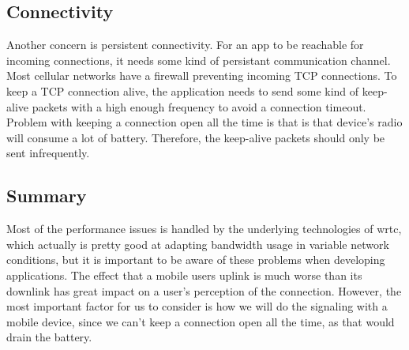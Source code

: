 \subsection{Connectivity}
Another concern is persistent connectivity. For an app to be reachable for incoming connections, it needs some kind of persistant communication channel. Most cellular networks have a firewall preventing incoming TCP connections\cite{isomaki2012considerations}. To keep a TCP connection alive, the application needs to send some kind of keep-alive packets with a high enough frequency to avoid a connection timeout. Problem with keeping a connection open all the time is that is that device's radio will consume a lot of battery. Therefore, the keep-alive packets should only be sent infrequently.

\subsection{Summary}
Most of the performance issues is handled by the underlying technologies of \gls{wrtc}, which actually is pretty good at adapting bandwidth usage in variable network conditions, but it is important to be aware of these problems when developing applications. The effect that a mobile users uplink is much worse than its downlink has great impact on a user's perception of the connection. However, the most important factor for us to consider is how we will do the signaling with a mobile device, since we can't keep a connection open all the time, as that would drain the battery.